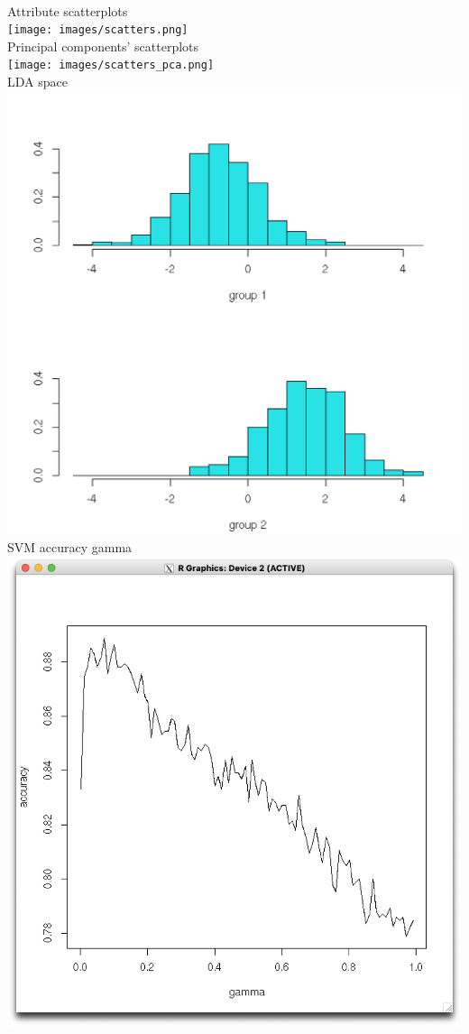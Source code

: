 \documentclass[
]{article}
\begin{document}
\pagebreak \\
Attribute scatterplots\\
\texttt{[image: images/scatters.png]}
\pagebreak \\
Principal components' scatterplots\\
\texttt{[image: images/scatters\_pca.png]}
\pagebreak \\
LDA space\\
\includegraphics{images/lda.png}
\pagebreak \\
SVM accuracy gamma\\
\includegraphics{images/gamma.png}
\end{document}
